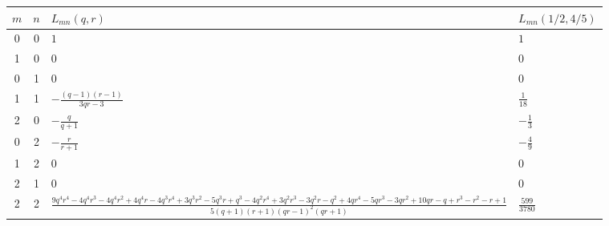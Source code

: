 \begin{tabular}{c c l l}
\toprule
$m$ & $n$ & $L_{mn}(q,r)$ & $L_{mn}(1/2,4/5)$ \\
\midrule
0 & 0 & $1$ & $1$ \\
1 & 0 & $0$ & $0$ \\
0 & 1 & $0$ & $0$ \\
1 & 1 & $- \frac{\left(q - 1\right) \left(r - 1\right)}{3 q r - 3}$ & $\frac{1}{18}$ \\
2 & 0 & $- \frac{q}{q + 1}$ & $- \frac{1}{3}$ \\
0 & 2 & $- \frac{r}{r + 1}$ & $- \frac{4}{9}$ \\
1 & 2 & $0$ & $0$ \\
2 & 1 & $0$ & $0$ \\
2 & 2 & $\frac{9 q^{4} r^{4} - 4 q^{4} r^{3} - 4 q^{4} r^{2} + 4 q^{4} r - 4 q^{3} r^{4} + 3 q^{3} r^{2} - 5 q^{3} r + q^{3} - 4 q^{2} r^{4} + 3 q^{2} r^{3} - 3 q^{2} r - q^{2} + 4 q r^{4} - 5 q r^{3} - 3 q r^{2} + 10 q r - q + r^{3} - r^{2} - r + 1}{5 \left(q + 1\right) \left(r + 1\right) \left(q r - 1\right)^{2} \left(q r + 1\right)}$ & $\frac{599}{3780}$ \\
\bottomrule
\end{tabular}
